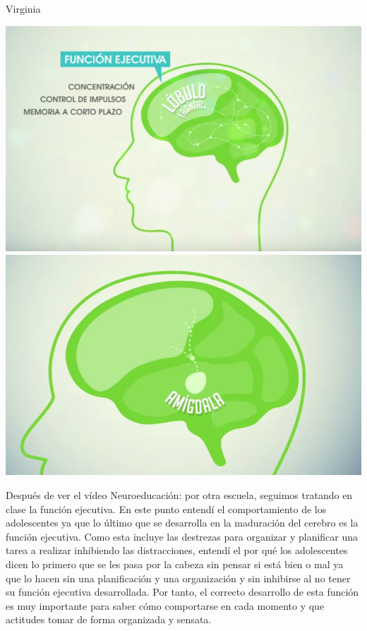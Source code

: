 \begin{opin}{\virgicolor}{Virginia}
\begin{minipage}[hbtp]{1.0\linewidth}
\centering
\includegraphics[scale=0.2]{img/viryi1.png}
\includegraphics[scale=0.2]{img/viryi2.png}
\label{viramigdala}
\end{minipage}

Después de ver el vídeo Neuroeducación: por otra escuela, seguimos tratando en clase la función ejecutiva. En este punto entendí el comportamiento de los adolescentes ya que lo último que se desarrolla en la maduración del cerebro es la función ejecutiva. Como esta incluye las destrezas para organizar y planificar una tarea a realizar inhibiendo las distracciones, entendí el por qué los adolescentes dicen lo primero que se les pasa por la cabeza sin pensar si está bien o mal ya que lo hacen sin una planificación y una organización y sin inhibirse al no tener su función ejecutiva desarrollada. Por tanto, el correcto desarrollo de esta función es muy importante para saber cómo comportarse en cada momento y que actitudes tomar de forma organizada y sensata.


\end{opin}
